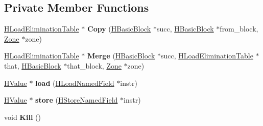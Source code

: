 \subsection*{Private Member Functions}
\begin{DoxyCompactItemize}
\item 
\hyperlink{classv8_1_1internal_1_1_h_load_elimination_table}{H\+Load\+Elimination\+Table} $\ast$ {\bfseries Copy} (\hyperlink{classv8_1_1internal_1_1_h_basic_block}{H\+Basic\+Block} $\ast$succ, \hyperlink{classv8_1_1internal_1_1_h_basic_block}{H\+Basic\+Block} $\ast$from\+\_\+block, \hyperlink{classv8_1_1internal_1_1_zone}{Zone} $\ast$zone)\hypertarget{classv8_1_1internal_1_1_h_load_elimination_table_a3ef35bde1d94245261015bdb31096c27}{}\label{classv8_1_1internal_1_1_h_load_elimination_table_a3ef35bde1d94245261015bdb31096c27}

\item 
\hyperlink{classv8_1_1internal_1_1_h_load_elimination_table}{H\+Load\+Elimination\+Table} $\ast$ {\bfseries Merge} (\hyperlink{classv8_1_1internal_1_1_h_basic_block}{H\+Basic\+Block} $\ast$succ, \hyperlink{classv8_1_1internal_1_1_h_load_elimination_table}{H\+Load\+Elimination\+Table} $\ast$that, \hyperlink{classv8_1_1internal_1_1_h_basic_block}{H\+Basic\+Block} $\ast$that\+\_\+block, \hyperlink{classv8_1_1internal_1_1_zone}{Zone} $\ast$zone)\hypertarget{classv8_1_1internal_1_1_h_load_elimination_table_abec379e1a96365fef54475b24806a1f8}{}\label{classv8_1_1internal_1_1_h_load_elimination_table_abec379e1a96365fef54475b24806a1f8}

\item 
\hyperlink{classv8_1_1internal_1_1_h_value}{H\+Value} $\ast$ {\bfseries load} (\hyperlink{classv8_1_1internal_1_1_h_load_named_field}{H\+Load\+Named\+Field} $\ast$instr)\hypertarget{classv8_1_1internal_1_1_h_load_elimination_table_adb839aeec636ef500c65861573b8dfd8}{}\label{classv8_1_1internal_1_1_h_load_elimination_table_adb839aeec636ef500c65861573b8dfd8}

\item 
\hyperlink{classv8_1_1internal_1_1_h_value}{H\+Value} $\ast$ {\bfseries store} (\hyperlink{classv8_1_1internal_1_1_h_store_named_field}{H\+Store\+Named\+Field} $\ast$instr)\hypertarget{classv8_1_1internal_1_1_h_load_elimination_table_a48fd58f21554c9770e517b29d8fbbcb4}{}\label{classv8_1_1internal_1_1_h_load_elimination_table_a48fd58f21554c9770e517b29d8fbbcb4}

\item 
void {\bfseries Kill} ()\hypertarget{classv8_1_1internal_1_1_h_load_elimination_table_a30856c1d8cd7a20c0417956bb7aab4b5}{}\label{classv8_1_1internal_1_1_h_load_elimination_table_a30856c1d8cd7a20c0417956bb7aab4b5}


\end{DoxyCompactItemize}
